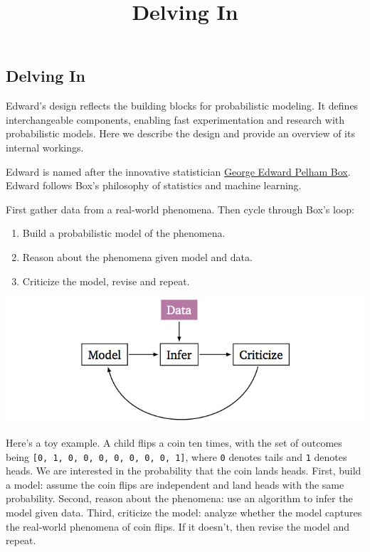 \title{Delving In}

\subsection{Delving In}

Edward's design reflects the building blocks for probabilistic
modeling. It defines interchangeable components, enabling fast
experimentation and research with probabilistic models.  Here we
describe the design and provide an overview of its internal workings.

Edward is named after the innovative statistician
\href{https://en.wikipedia.org/wiki/George_E._P._Box}{George Edward
Pelham Box}. Edward follows Box's philosophy of statistics and machine
learning.

First gather data from a real-world phenomena. Then cycle through Box's
loop:

\begin{enumerate}
\item Build a probabilistic model of the phenomena.
\item Reason about the phenomena given model and data.
\item Criticize the model, revise and repeat.
\end{enumerate}

\includegraphics{images/model_infer_criticize.png}

Here's a toy example. A child flips a coin ten times, with the set of
outcomes being \texttt{{[}0,\ 1,\ 0,\ 0,\ 0,\ 0,\ 0,\ 0,\ 0,\ 1{]}},
where \texttt{0} denotes tails and \texttt{1} denotes heads. We
are interested in the probability that the coin lands heads. First,
build a model: assume the coin flips are independent and land heads with
the same probability. Second, reason about the phenomena: use an algorithm
to infer the model given data. Third, criticize the model: analyze
whether the model captures the real-world phenomena of coin flips. If it
doesn't, then revise the model and repeat.

